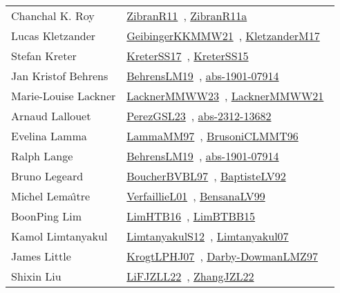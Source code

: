 {\begin{longtable}{p{4cm}p{20cm}}
Chanchal K. Roy & \href{works/ZibranR11.pdf}{ZibranR11}~\cite{ZibranR11}, \href{works/ZibranR11a.pdf}{ZibranR11a}~\cite{ZibranR11a}\\
Lucas Kletzander & \href{works/GeibingerKKMMW21.pdf}{GeibingerKKMMW21}~\cite{GeibingerKKMMW21}, \href{works/KletzanderM17.pdf}{KletzanderM17}~\cite{KletzanderM17}\\
Stefan Kreter & \href{works/KreterSS17.pdf}{KreterSS17}~\cite{KreterSS17}, \href{works/KreterSS15.pdf}{KreterSS15}~\cite{KreterSS15}\\
Jan Kristof Behrens & \href{works/BehrensLM19.pdf}{BehrensLM19}~\cite{BehrensLM19}, \href{works/abs-1901-07914.pdf}{abs-1901-07914}~\cite{abs-1901-07914}\\
Marie{-}Louise Lackner & \href{works/LacknerMMWW23.pdf}{LacknerMMWW23}~\cite{LacknerMMWW23}, \href{works/LacknerMMWW21.pdf}{LacknerMMWW21}~\cite{LacknerMMWW21}\\
Arnaud Lallouet & \href{works/PerezGSL23.pdf}{PerezGSL23}~\cite{PerezGSL23}, \href{works/abs-2312-13682.pdf}{abs-2312-13682}~\cite{abs-2312-13682}\\
Evelina Lamma & \href{works/LammaMM97.pdf}{LammaMM97}~\cite{LammaMM97}, \href{works/BrusoniCLMMT96.pdf}{BrusoniCLMMT96}~\cite{BrusoniCLMMT96}\\
Ralph Lange & \href{works/BehrensLM19.pdf}{BehrensLM19}~\cite{BehrensLM19}, \href{works/abs-1901-07914.pdf}{abs-1901-07914}~\cite{abs-1901-07914}\\
Bruno Legeard & \href{}{BoucherBVBL97}~\cite{BoucherBVBL97}, \href{works/BaptisteLV92.pdf}{BaptisteLV92}~\cite{BaptisteLV92}\\
Michel Lema{\^{\i}}tre & \href{works/VerfaillieL01.pdf}{VerfaillieL01}~\cite{VerfaillieL01}, \href{works/BensanaLV99.pdf}{BensanaLV99}~\cite{BensanaLV99}\\
BoonPing Lim & \href{works/LimHTB16.pdf}{LimHTB16}~\cite{LimHTB16}, \href{works/LimBTBB15.pdf}{LimBTBB15}~\cite{LimBTBB15}\\
Kamol Limtanyakul & \href{works/LimtanyakulS12.pdf}{LimtanyakulS12}~\cite{LimtanyakulS12}, \href{works/Limtanyakul07.pdf}{Limtanyakul07}~\cite{Limtanyakul07}\\
James Little & \href{works/KrogtLPHJ07.pdf}{KrogtLPHJ07}~\cite{KrogtLPHJ07}, \href{works/Darby-DowmanLMZ97.pdf}{Darby-DowmanLMZ97}~\cite{Darby-DowmanLMZ97}\\
Shixin Liu & \href{works/LiFJZLL22.pdf}{LiFJZLL22}~\cite{LiFJZLL22}, \href{works/ZhangJZL22.pdf}{ZhangJZL22}~\cite{ZhangJZL22}\\

\end{longtable}}
